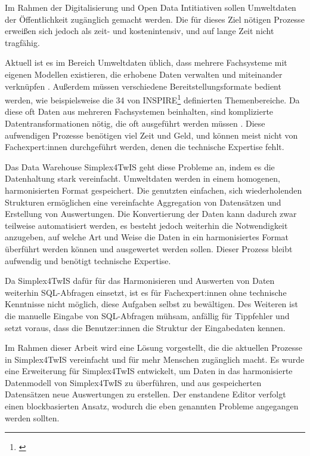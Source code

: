 Im Rahmen der Digitalisierung und Open Data Intitiativen sollen Umweltdaten der Öffentlichkeit zugänglich gemacht werden. Die für dieses Ziel nötigen Prozesse erweißen sich jedoch als zeit- und kostenintensiv, und auf lange Zeit nicht tragfähig.

Aktuell ist es im Bereich Umweltdaten üblich, dass mehrere Fachsysteme mit eigenen Modellen existieren, die erhobene Daten verwalten und miteinander verknüpfen \parencite{grossmannEnvVisioUniverselle2021}. Außerdem müssen verschiedene Bereitstellungsformate bedient werden, wie beispielsweise die 34 von INSPIRE\footnote{\textcite{inspireRichtlinie20072007}} definierten Themenbereiche. Da diese oft Daten aus mehreren Fachsystemen beinhalten, sind komplizierte Datentransformationen nötig, die oft ausgeführt werden müssen \parencite{grossmannEnvVisioUniverselle2021}. Diese aufwendigen Prozesse benötigen viel Zeit und Geld, und können meist nicht von Fachexpert:innen durchgeführt werden, denen die technische Expertise fehlt.

Das Data Warehouse Simplex4TwIS geht diese Probleme an, indem es die Datenhaltung stark vereinfacht. Umweltdaten werden in einem homogenen, harmonisierten Format gespeichert. Die genutzten einfachen, sich wiederholenden Strukturen ermöglichen eine vereinfachte Aggregation von Datensätzen und Erstellung von Auswertungen. Die Konvertierung der Daten kann dadurch zwar teilweise automatisiert werden, es besteht jedoch weiterhin die Notwendigkeit anzugeben, auf welche Art und Weise die Daten in ein harmonisiertes Format überführt werden können und ausgewertet werden sollen. Dieser Prozess bleibt aufwendig und benötigt technische Expertise.

Da Simplex4TwIS dafür für das Harmonisieren und Auswerten von Daten weiterhin \acs{SQL}-Abfragen einsetzt, ist es für Fachexpert:innen ohne technische Kenntnisse nicht möglich, diese Aufgaben selbst zu bewältigen. Des Weiteren ist die manuelle Eingabe von \acs{SQL}-Abfragen mühsam, anfällig für Tippfehler und setzt voraus, dass die Benutzer:innen die Struktur der Eingabedaten kennen.

\pskip
Im Rahmen dieser Arbeit wird eine Lösung vorgestellt, die die aktuellen Prozesse in Simplex4TwIS vereinfacht und für mehr Menschen zugänglich macht. Es wurde eine Erweiterung für Simplex4TwIS entwickelt, um Daten in das harmonisierte Datenmodell von Simplex4TwIS zu überführen, und aus gespeicherten Datensätzen neue Auswertungen zu erstellen. Der enstandene Editor verfolgt einen blockbasierten Ansatz, wodurch die eben genannten Probleme angegangen werden sollten.

